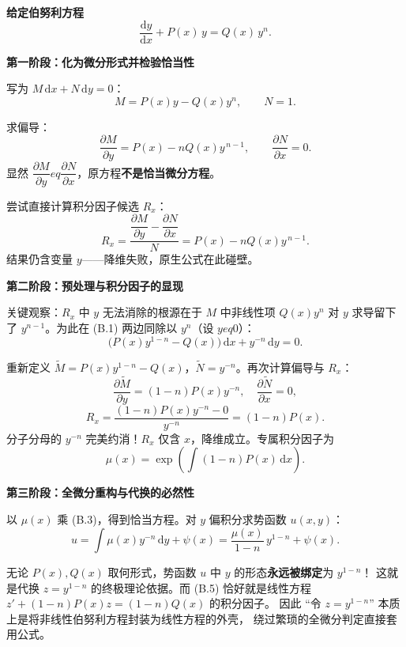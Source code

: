 \documentclass[lang=cn,11pt]{elegantbook}
\begin{document}
\begin{solution}
\textbf{给定伯努利方程}
\[
\frac{\mathrm{d}y}{\mathrm{d}x}+P(x)\,y=Q(x)\,y^{n}. \tag{B.1}
\]

\textbf{第一阶段：化为微分形式并检验恰当性}

写为 $M\,\mathrm{d}x+N\,\mathrm{d}y=0$：
\[
M=P(x)y-Q(x)y^{n},\qquad N=1.
\]

求偏导：
\[
\frac{\partial M}{\partial y}=P(x)-nQ(x)y^{\,n-1},
\qquad
\frac{\partial N}{\partial x}=0.
\]
显然 $\dfrac{\partial M}{\partial y}
eq\dfrac{\partial N}{\partial x}$，原方程\textbf{不是恰当微分方程}。

尝试直接计算积分因子候选 $R_x$：
\[
R_{x}=\frac{\dfrac{\partial M}{\partial y}-\dfrac{\partial N}{\partial x}}{N}
 =P(x)-nQ(x)y^{\,n-1}.
\]
结果仍含变量 $y$——降维失败，原生公式在此碰壁。

\textbf{第二阶段：预处理与积分因子的显现}

关键观察：$R_x$ 中 $y$ 无法消除的根源在于 $M$ 中非线性项 $Q(x)y^n$
对 $y$ 求导留下了 $y^{n-1}$。为此在 (B.1) 两边同除以 $y^n$（设 $y
eq 0$）：
\[
\bigl(P(x)y^{1-n}-Q(x)\bigr)\,\mathrm{d}x+y^{-n}\,\mathrm{d}y=0. \tag{B.3}
\]

重新定义 $\widetilde M=P(x)y^{1-n}-Q(x)$，$\widetilde N=y^{-n}$。再次计算偏导与 $R_x$：
\[
\frac{\partial\widetilde M}{\partial y}=(1-n)P(x)y^{-n},\quad
\frac{\partial\widetilde N}{\partial x}=0,
\]
\begin{equation*}
R_{x}=\frac{(1-n)P(x)y^{-n}-0}{y^{-n}}
=\boxed{(1-n)P(x)}. \tag{B.4}
\end{equation*}
分子分母的 $y^{-n}$ 完美约消！$R_x$ 仅含 $x$，降维成立。专属积分因子为
\begin{equation}
\mu(x)=\exp\!\left(\int(1-n)P(x)\,\mathrm{d}x\right). \tag{B.5}
\end{equation}

\textbf{第三阶段：全微分重构与代换的必然性}

以 $\mu(x)$ 乘 (B.3)，得到恰当方程。对 $y$ 偏积分求势函数 $u(x,y)$：
\[
u=\int\mu(x)y^{-n}\,\mathrm{d}y+\psi(x)
=\frac{\mu(x)}{1-n}\,y^{1-n}+\psi(x). \tag{B.6}
\]

\begin{remark}[核心发现]
无论 $P(x),Q(x)$ 取何形式，势函数 $u$ 中 $y$ 的形态\textbf{永远被绑定}为 $y^{1-\!n}$！
这就是代换 $z=y^{1-n}$ 的终极理论依据。而 (B.5) 恰好就是线性方程
$z'+(1-n)P(x)z=(1-n)Q(x)$ 的积分因子。
因此 ``令 $z=y^{1-n}$'' 本质上是将非线性伯努利方程封装为线性方程的外壳，
绕过繁琐的全微分判定直接套用公式。
\end{remark}


\end{solution}
\end{document}
